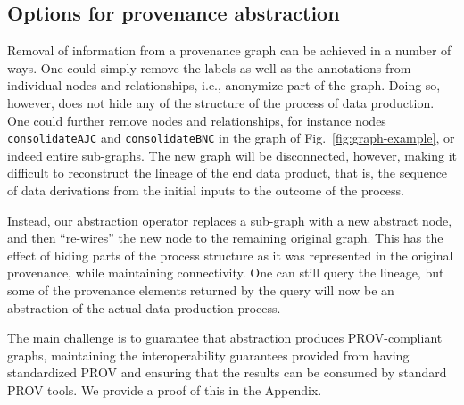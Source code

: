
\subsection{Options for provenance abstraction }  \label{sec:contributions}

Removal of information from a provenance graph can be achieved in a number of ways.
%
 One could simply remove the labels as well as the annotations from individual nodes and relationships, i.e., anonymize part of the graph. Doing so, however, does not hide any of the structure of the process of data production. One could further remove nodes and relationships, for instance nodes \texttt{consolidateAJC} and \texttt{consolidateBNC} in the graph of Fig.~\ref{fig:graph-example}, or  indeed entire sub-graphs. The new graph will be disconnected, however, making it difficult to reconstruct the lineage of the end data product, that is, the sequence of data derivations from the initial inputs to the outcome of the process.
 
Instead, our abstraction operator replaces a sub-graph with a new abstract node, and then ``re-wires'' the new node to the remaining original graph. This has the effect of hiding parts of the process structure as it was represented in the original provenance, while maintaining connectivity. One can still query the lineage, but some of the provenance elements returned by the query will now be an abstraction of the actual data production process.

The main challenge is to guarantee that abstraction produces PROV-compliant  graphs,   maintaining the interoperability guarantees provided from having standardized PROV and ensuring that the results can be consumed by standard PROV tools. We provide a proof of this in the Appendix.




 




 
